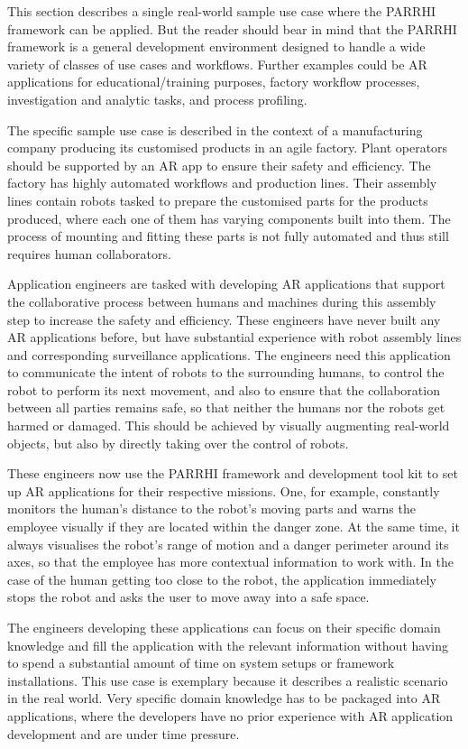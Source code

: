 This section describes a single real-world sample use case where the PARRHI framework can be applied. But the reader should bear in mind  that the PARRHI framework is a general development environment designed to handle a wide variety of classes of use cases and workflows. Further examples could be AR applications for educational/training purposes, factory workflow processes, investigation and analytic tasks, and process profiling.

The specific sample use case is described in the context of a manufacturing company producing its customised products in an agile factory. Plant operators should be supported by an AR app to ensure their safety and efficiency. The factory has highly automated workflows and production lines. Their assembly lines contain robots tasked to prepare the customised parts for the products produced, where each one of them has varying components built into them. The process of mounting and fitting these parts is not fully automated and thus still requires human collaborators.

Application engineers are tasked with developing AR applications that support the collaborative process between humans and machines during this assembly step to increase the safety and efficiency. These engineers have never built any AR applications before, but have substantial experience with robot assembly lines and corresponding surveillance applications. The engineers need this application to communicate the intent of robots to the surrounding humans, to control the robot to perform its next movement, and also to ensure that the collaboration between all parties remains safe, so that neither the humans nor the robots get harmed or damaged. This should be achieved by visually augmenting real-world objects, but also by directly taking over the control of robots.

These engineers now use the PARRHI framework and development tool kit to set up AR applications for their respective missions. One, for example, constantly monitors the human’s distance to the robot’s moving parts and warns the employee visually if they are located within the danger zone. At the same time, it always visualises the robot’s range of motion and a danger perimeter around its axes, so that the employee has more contextual information to work with. In the case of the human getting too close to the robot, the application immediately stops the robot and asks the user to move away into a safe space.

The engineers developing these applications can focus on their specific domain knowledge and fill the application with the relevant information without having to spend a substantial amount of time on system setups or framework installations. This use case is exemplary because it describes a realistic scenario in the real world. Very specific domain knowledge has to be packaged into AR applications, where the developers have no prior experience with AR application development and are under time pressure.

